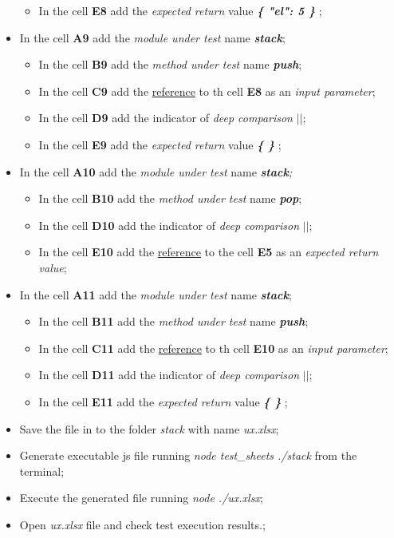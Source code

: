 \begin{itemize}
\begin{itemize}
		\item In the cell \textbf{E8} add the \textit{expected return} value\textit{ \textbf{ \{ "el": 5 \} }};
	\end{itemize}
%	
	\item In the cell \textbf{A9} add the \textit{module under test} name\textit{ \textbf{stack}};
	\begin{itemize}
		\item In the cell \textbf{B9} add the \textit{method under test} name \textit{\textbf{push}};
		\item In the cell \textbf{C9} add the \underline{reference} to th cell \textbf{E8} as an \textit{input parameter};
		\item In the cell \textbf{D9} add the indicator of\textit{ deep comparison}\textit{ \textbf{$||$}};
		\item In the cell \textbf{E9} add the \textit{expected return} value\textit{ \textbf{ \{ \} }};
	\end{itemize}
%	
	\item In the cell \textbf{A10} add the \textit{module under test} name\textit{\textbf{ stack};}
	\begin{itemize}
		\item In the cell \textbf{B10} add the \textit{method under test} name\textit{ \textbf{ pop}};
		\item In the cell \textbf{D10} add the indicator of \textit{ deep comparison}\textit{ \textbf{$||$}};
		\item In the cell \textbf{E10} add the \underline{reference} to the cell \textbf{E5} as an \textit{expected return value};
	\end{itemize}
%	
	\item In the cell \textbf{A11} add the \textit{module under test} name \textit{\textbf{stack}};
	\begin{itemize}
		\item In the cell \textbf{B11} add the \textit{method under test} name \textit{\textbf{push}};
		\item In the cell \textbf{C11} add the \underline{reference} to th cell \textbf{E10} as an\textit{ input parameter};
		\item In the cell \textbf{D11} add the indicator of \textit{deep comparison}\textit{ \textbf{$||$}};
		\item In the cell \textbf{E11} add the \textit{expected return} value \textit{\textbf{ \{ \} }};
	\end{itemize}
%	
	\item Save the file in to the folder \textit{stack} with name \textit{ux.xlsx};
%	
	\item Generate executable js file running \textit{node test\_sheets ./stack} from the terminal;
%	
	\item Execute the generated file running \textit{node ./ux.xlsx};
	
	\item Open \textit{ux.xlsx} file and check test execution results.;
\end{itemize}


